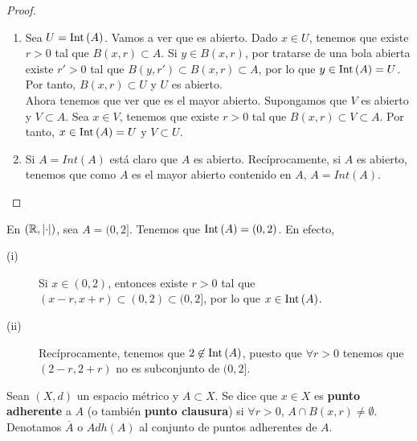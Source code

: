 \begin{proof}
\begin{enumerate}
\item Sea $\displaystyle U = \operatorname{Int}\left(A\right) $. Vamos a ver que es abierto. Dado $\displaystyle x \in U $, tenemos que existe $\displaystyle r > 0 $ tal que $\displaystyle B\left(x,r\right) \subset A $. Si $\displaystyle y \in B\left(x,r\right) $, por tratarse de una bola abierta existe $\displaystyle r' > 0 $ tal que $\displaystyle B\left(y,r'\right)\subset B\left(x,r\right) \subset A $, por lo que $\displaystyle y \in \operatorname{Int}\left(A\right) = U $. Por tanto, $\displaystyle B\left(x,r\right) \subset U $ y $\displaystyle U $  es abierto. \\ 
	Ahora tenemos que ver que es el mayor abierto. Supongamos que $\displaystyle V $ es abierto y $\displaystyle V \subset A $. Sea $\displaystyle x \in V $, tenemos que existe $\displaystyle r > 0 $ tal que $\displaystyle B\left(x,r\right) \subset V \subset A$. Por tanto, $\displaystyle x \in \operatorname{Int}\left(A\right) = U$ y $\displaystyle V \subset U $.
\item Si $\displaystyle A = Int\left(A\right) $ está claro que $\displaystyle A $ es abierto. Recíprocamente, si $\displaystyle A $ es abierto, tenemos que como $\displaystyle A $ es el mayor abierto contenido en $\displaystyle A $, $\displaystyle A = Int\left(A\right) $.
\end{enumerate}
\end{proof}
\begin{eg}
	En $\displaystyle \left(\mathbb{R}, \left| \cdot \right|\right) $, sea $\displaystyle A = (0,2] $. Tenemos que $\displaystyle \operatorname{Int}\left(A\right) = \left(0,2\right) $. En efecto, 
	\begin{description}
		\item[(i)] Si $\displaystyle x \in \left(0,2\right) $, entonces existe $\displaystyle r > 0 $ tal que $\displaystyle \left(x -r, x+r\right) \subset \left(0,2\right) \subset (0,2] $, por lo que $\displaystyle x \in \operatorname{Int}\left(A\right) $.
	\item[(ii)] Recíprocamente, tenemos que $\displaystyle 2 \not\in \operatorname{Int}\left(A\right) $, puesto que $\displaystyle \forall r > 0 $ tenemos que $\displaystyle \left(2-r, 2 + r\right)$ no es subconjunto de $ (0,2] $.
	\end{description}
\end{eg}
\begin{definition}
Sean $\displaystyle \left(X,d\right) $ un espacio métrico y $\displaystyle A \subset X $. Se dice que $\displaystyle x \in X $ es \textbf{punto adherente} a $\displaystyle A $ (o también \textbf{punto clausura}) si $\displaystyle \forall r > 0 $, $\displaystyle A \cap B\left(x,r\right) \neq \emptyset $. Denotamos $\displaystyle \overline{A} $ o $\displaystyle Adh\left(A\right) $ al conjunto de puntos adherentes de $\displaystyle A $.
\end{definition}
